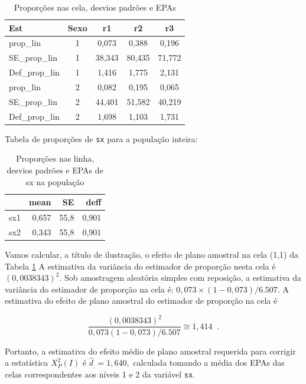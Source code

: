 \documentclass[]{book}
\theoremstyle{definition}
\theoremstyle{definition}
\theoremstyle{definition}
\theoremstyle{remark}
\begin{document}
\begin{table}

\caption{\label{tab:propcelas}Proporções nas cela, desvios padrões e EPAs}
\centering
\begin{tabular}[t]{lcccc}
\toprule
Est & Sexo & r1 & r2 & r3\\
\midrule
prop\_lin & 1 & 0,073 & 0,388 & 0,196\\
SE\_prop\_lin & 1 & 38,343 & 80,435 & 71,772\\
Def\_prop\_lin & 1 & 1,416 & 1,775 & 2,131\\
prop\_lin & 2 & 0,082 & 0,195 & 0,065\\
SE\_prop\_lin & 2 & 44,401 & 51,582 & 40,219\\
Def\_prop\_lin & 2 & 1,698 & 1,103 & 1,731\\
\bottomrule
\end{tabular}
\end{table}

Tabela de proporções de \texttt{sx} para a população inteira:

\begin{table}

\caption{\label{tab:unnamed-chunk-4}Proporções nas linha, desvios padrões e EPAs de sx na população}
\centering
\begin{tabular}[t]{l|r|r|r}
\hline
  & mean & SE & deff\\
\hline
sx1 & 0,657 & 55,8 & 0,901\\
\hline
sx2 & 0,343 & 55,8 & 0,901\\
\hline
\end{tabular}
\end{table}

Vamos calcular, a título de ilustração, o efeito de plano amostral na
cela (1,1) da Tabela \ref{tab:propcelas} A estimativa da variância do
estimador de proporção nesta cela é \(\left(0,0038343\right) ^{2}\). Sob
amostragem aleatória simples com reposição, a estimativa da variância do
estimador de proporção na cela é:
\(0,073\times \left( 1-0,073\right) /6.507\). A estimativa do efeito de
plano amostral do estimador de proporção na cela é

\[
\frac{\left( 0,0038343\right) ^{2}}{0,073\left( 1-0,073\right) /6.507}\cong
1,414\;\;. 
\]

Portanto, a estimativa do efeito médio de plano amostral requerida para
corrigir a estatística \(X_{P}^{2}\left( I\right)\) é
\(\hat{d}_{.}=1,640,\) calculada tomando a média dos EPAs das celas
correspondentes aos níveis 1 e 2 da variável \texttt{sx}.
\end{document}
